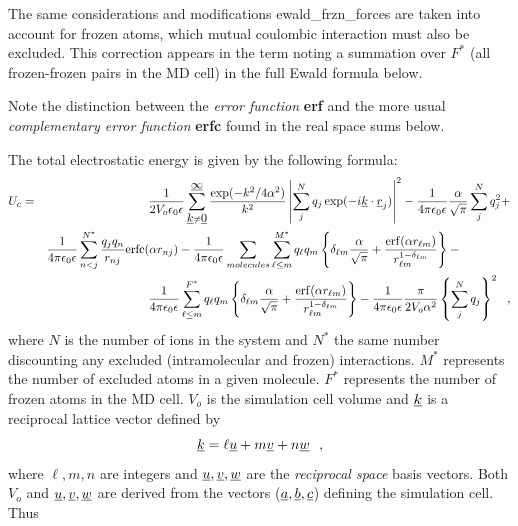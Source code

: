 The same considerations and modifications {\sc ewald\_frzn\_forces}
are taken into account for frozen atoms, which mutual coulombic
interaction must also be excluded.  This correction appears in the
term noting a summation over $F^{*}$ (all frozen-frozen pairs in the
MD cell) in the full Ewald formula below.

Note the distinction between the {\em error function} {\bf erf} and
the more usual {\em complementary error function} {\bf erfc} found
in the real space sums below.

The total electrostatic energy is given by the following formula:
\begin{eqnarray}
U_{c}&=&\frac{1}{2V_{o} \epsilon_{0}\epsilon} \sum_{\mbox{$\underline{k}$} \neq
\mbox{$\underline{0}$}}^{\mbox{$\underline{\infty}$}} \frac{\exp(-k^{2}/4\alpha^{2})}{k^{2}}
\left|\sum_{j}^{N} q_{j}\exp(-i\mbox{$\underline{k}$}\cdot\mbox{$\underline{r}$}_{j})\right|^{2} -
\frac{1}{4\pi\epsilon_{0}\epsilon} \frac{\alpha}{\sqrt{\pi}}
\sum_{j}^{N} q_{j}^2 + \nonumber \\
& & \frac{1}{4\pi\epsilon_{0}\epsilon} \sum_{n<j}^{N^{*}} \frac{q_{j}q_{n}}
{r_{nj}} {\rm erfc}(\alpha r_{nj}) - \frac{1}{4\pi\epsilon_{0}\epsilon}
\sum_{molecules} \sum_{\ell\le m}^{M^{*}} q_{\ell}q_{m} \left\{ \delta_{\ell m}
\frac{\alpha}{\sqrt{\pi}} + \frac{{\rm erf}(\alpha r_{\ell m})}{r_{\ell
m}^{1-\delta_{\ell m}}} \right\} - \phantom{xxxxxxx} \\
& & \frac{1}{4\pi\epsilon_{0}\epsilon} \sum_{\ell\le m}^{F^{*}}
q_{\ell}q_{m} \left\{ \delta_{\ell m} \frac{\alpha}{\sqrt{\pi}} +
\frac{{\rm erf}(\alpha r_{\ell m})}{r_{\ell m}^{1-\delta_{\ell m}}}
\right\} - \frac{1}{4\pi\epsilon_{0}\epsilon} \frac{\pi}{2V_{o} \alpha^{2}}
\left\{ \sum_{j}^{N} q_{j} \right\}^{2}~~, \nonumber
\end{eqnarray}
where $N$ is the number of ions in the system and $N^{*}$ the same
number discounting any excluded (intramolecular and frozen)
interactions.  $M^{*}$ represents the number of excluded atoms in
a given molecule.  $F^{*}$ represents the number of frozen atoms
in the MD cell.  $V_{o}$ is the simulation cell volume and
$\mbox{$\underline{k}$}$ is a reciprocal lattice vector defined by
\begin{equation}
\mbox{$\underline{k}$} = \ell \mbox{$\underline{u}$} + m \mbox{$\underline{v}$} + n \mbox{$\underline{w}$} \label{k-vector}~~,
\end{equation}
where $\ell,m,n$ are integers and $\mbox{$\underline{u}$},\mbox{$\underline{v}$},\mbox{$\underline{w}$}$ are
the {\em reciprocal space} basis vectors.  Both $V_{o}$ and
$\mbox{$\underline{u}$},\mbox{$\underline{v}$},\mbox{$\underline{w}$}$ are derived from the vectors
($\mbox{$\underline{a}$},\mbox{$\underline{b}$},\mbox{$\underline{c}$}$) defining the simulation cell.  Thus

